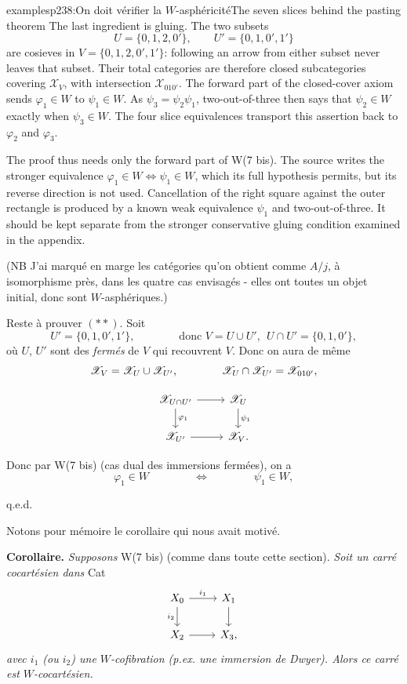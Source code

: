\begin{dcomment}{examples}{p238:On doit vérifier la $W$-asphéricité}{The seven slices behind the pasting theorem}
The last ingredient is gluing. The two subsets
\[
 U=\{0,1,2,0'\},\qquad
 U'=\{0,1,0',1'\}
\]
are cosieves in $V=\{0,1,2,0',1'\}$: following an arrow from either subset never leaves that subset. Their total categories are therefore closed subcategories covering $\mathcal X_V$, with intersection $\mathcal X_{010'}$. The forward part of the closed-cover axiom sends $\varphi_1\in W$ to $\psi_1\in W$. As $\psi_3=\psi_2\psi_1$, two-out-of-three then says that $\psi_2\in W$ exactly when $\psi_3\in W$. The four slice equivalences transport this assertion back to $\varphi_2$ and $\varphi_3$.

The proof thus needs only the forward part of W(7 bis). The source writes the stronger equivalence $\varphi_1\in W\Longleftrightarrow\psi_1\in W$, which its full hypothesis permits, but its reverse direction is not used. Cancellation of the right square against the outer rectangle is produced by a known weak equivalence $\psi_1$ and two-out-of-three. It should be kept separate from the stronger conservative gluing condition examined in the appendix.
\end{dcomment}



(NB J'ai marqué en marge les catégories qu'on obtient comme $A/j$, à isomorphisme près, dans les quatre cas envisagés - elles ont toutes un objet initial, donc sont $W$-asphériques.)

Reste à prouver $(\ast\ast)$. Soit
\[
U' = \{0,1,0',1'\}, \qquad\qquad \text{donc } V = U \cup U',\ \ U \cap U' = \{0,1,0'\},
\]
où $U$, $U'$ sont des \textit{fermés} de $V$ qui recouvrent $V$. Donc on aura de même
\[
\mathscr{X}_V = \mathscr{X}_U \cup \mathscr{X}_{U'}, \qquad\qquad \mathscr{X}_U \cap \mathscr{X}_{U'} = \mathscr{X}_{010'},
\]


\[
\begin{tikzcd}[ampersand replacement=\&]
\cX_{U\cap U'} \arrow[r] \arrow[d, "\varphi_1"] \& \cX_U \arrow[d, "\psi_1"] \\
\cX_{U'} \arrow[r] \& \cX_V.
\end{tikzcd}
\]

Donc par W(7 bis) (cas dual des immersions fermées), on a
\[
\varphi_1 \in W \qquad\qquad \Longleftrightarrow \qquad\qquad \psi_1 \in W,
\]

\hfill q.e.d.

Notons pour mémoire le corollaire qui nous avait motivé.

\textbf{Corollaire.} \textit{Supposons} W(7 bis) (comme dans toute cette section). \textit{Soit un carré cocartésien dans} Cat
\[
\begin{tikzcd}[ampersand replacement=\&]
X_0 \arrow[r, "i_1"] \arrow[d, "i_2"'] \& X_1 \arrow[d] \\
X_2 \arrow[r] \& X_3,
\end{tikzcd}
\]
\textit{avec $i_1$ (ou $i_2$) une $W$-cofibration (p.ex. une immersion de Dwyer). Alors ce carré est $W$-cocartésien.}

